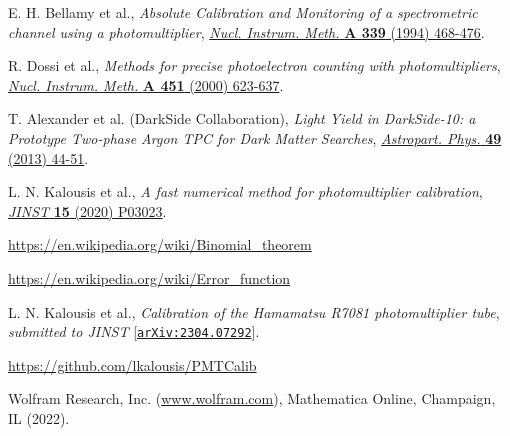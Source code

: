 \documentclass[a4paper,11pt]{article}
\begin{document}
\begin{thebibliography}{99}

 E. H. Bellamy {et al.}, \emph{Absolute Calibration and Monitoring of a spectrometric channel using a photomultiplier}, 
\href{https://www.sciencedirect.com/science/article/pii/016890029490183X}{\emph{Nucl. Instrum. Meth.} {\bf A 339} (1994) 468-476}. 

  R. Dossi {et al.}, \emph{Methods for precise photoelectron counting with photomultipliers}, 
\href{https://www.sciencedirect.com/science/article/pii/S0168900200003375}{\emph{Nucl. Instrum. Meth.} {\bf A 451} (2000) 623-637}.

 T. Alexander {et al.} (DarkSide Collaboration), \emph{Light Yield in DarkSide-10: a Prototype Two-phase Argon TPC for Dark Matter Searches}, 
\href{https://www.sciencedirect.com/science/article/pii/S0927650513001254?via\%3Dihub}{\emph{Astropart. Phys.} {\bf 49} (2013) 44-51}.

 L. N. Kalousis {et al.}, \emph{A fast numerical method for photomultiplier calibration},\\  
\href{https://iopscience.iop.org/article/10.1088/1748-0221/15/03/P03023}{\emph{JINST} {\bf 15} (2020) P03023}.

 \href{https://en.wikipedia.org/wiki/Binomial_theorem}{https://en.wikipedia.org/wiki/Binomial\_theorem}

 \href{https://en.wikipedia.org/wiki/Error_function}{https://en.wikipedia.org/wiki/Error\_function}

 L. N. Kalousis {et al.}, \emph{Calibration of the Hamamatsu R7081 photomultiplier tube}, \\ \emph{submitted to JINST} 
[\href{https://arxiv.org/abs/2304.07292}{\texttt{arXiv:2304.07292}}]. 

 \href{https://github.com/kalousis/PMTCalib}{https://github.com/lkalousis/PMTCalib}

 Wolfram Research, Inc. (\href{www.wolfram.com}{www.wolfram.com}), Mathematica Online, Champaign, IL (2022).

\end{thebibliography}
\end{document}
